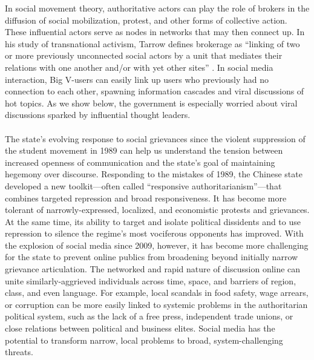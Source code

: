 \documentclass[12pt]{article}
\begin{document}
\begin{CJK*}{UTF8}{gbsn}
In social movement theory, authoritative actors can play the role of brokers in the diffusion of social mobilization, protest, and other forms of collective action. These influential actors serve as nodes in networks that may then connect up. In his  study of  transnational activism, Tarrow defines brokerage as ``linking of two or more previously unconnected social actors by a unit that mediates their relations with one another and/or with yet other sites'' \citep[190]{tarrow2005new}. In social media interaction, Big V-users can easily link up users who previously had no connection to each other, spawning information cascades and viral discussions of hot topics. As we show below, the government is especially worried about viral discussions sparked by influential thought leaders.

\paragraph{} The state's evolving response to social grievances since the violent suppression of the student movement in 1989 can help us understand the tension between increased openness of communication and the state's goal of maintaining hegemony over discourse. Responding to the mistakes of 1989, the Chinese state developed a new toolkit---often called ``responsive authoritarianism''---that combines targeted repression and broad responsiveness. It has become more tolerant of narrowly-expressed, localized, and economistic protests and grievances. At the same time, its ability to target and isolate political dissidents and to use repression to silence the regime's most vociferous opponents has improved. With the explosion of social media since 2009, however, it has become more challenging for the state to prevent online publics from broadening beyond initially narrow grievance articulation. The networked and rapid nature of discussion online can unite similarly-aggrieved individuals across time, space, and barriers of region, class, and even language. For example, local scandals in food safety, wage arrears, or corruption can be more easily linked to systemic problems in the authoritarian political system, such as the lack of a free press, independent trade unions, or close relations between political and business elites. Social media has the potential to transform narrow, local problems to broad, system-challenging threats.
 

\end{CJK*}
\end{document}
